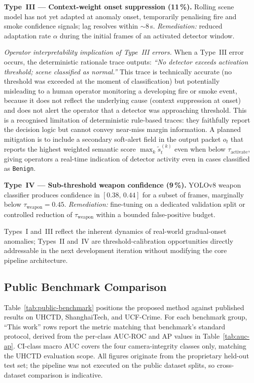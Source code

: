 \documentclass[a4paper,fleqn]{cas-dc}
\begin{document}
\textbf{Type~III — Context-weight onset suppression (11\,\%).}
Rolling scene model has not yet adapted at anomaly onset, temporarily
penalising fire and smoke confidence signals; lag resolves within $\sim$8\,s.
\textit{Remediation:} reduced adaptation rate $\alpha$ during the initial
frames of an activated detector window.
 
\textit{Operator interpretability implication of Type~III errors.} When a Type~III error occurs, the deterministic rationale trace outputs: \textit{``No detector exceeds activation threshold; scene classified as normal.''} This trace is technically accurate (no threshold was exceeded at the moment of classification) but potentially misleading to a human operator monitoring a developing fire or smoke event, because it does not reflect the underlying cause (context suppression at onset) and does not alert the operator that a detector was approaching threshold. This is a recognised limitation of deterministic rule-based traces: they faithfully report the decision logic but cannot convey near-miss margin information. A planned mitigation is to include a secondary soft-alert field in the output packet $o_t$ that reports the highest weighted semantic score $\max_k \tilde{s}_t^{(k)}$ even when below $\tau_{\text{activate}}$, giving operators a real-time indication of detector activity even in cases classified as \texttt{Benign}.
 
\textbf{Type~IV — Sub-threshold weapon confidence (9\,\%).}
YOLOv8 weapon classifier produces confidence in $[0.38,\,0.44]$ for a subset
of frames, marginally below $\tau_{\text{weapon}} = 0.45$.
\textit{Remediation:} fine-tuning on a dedicated validation split or
controlled reduction of $\tau_{\text{weapon}}$ within a bounded
false-positive budget.
 
Types~I and~III reflect the inherent dynamics of real-world gradual-onset
anomalies; Types~II and~IV are threshold-calibration opportunities directly
addressable in the next development iteration without modifying the core
pipeline architecture.
 
\FloatBarrier
\subsection{Public Benchmark Comparison}
\label{sec:revision-experiments}
 
Table~\ref{tab:public-benchmark} positions the proposed method against published results on UHCTD, ShanghaiTech, and UCF-Crime. For each benchmark group, ``This work'' rows report the metric matching that benchmark's standard protocol, derived from the per-class AUC-ROC and AP values in Table~\ref{tab:auc-ap}. CI-class macro AUC covers the four camera-integrity classes only, matching the UHCTD evaluation scope. All figures originate from the proprietary held-out test set; the pipeline was not executed on the public dataset splits, so cross-dataset comparison is indicative.
 
\end{document}
